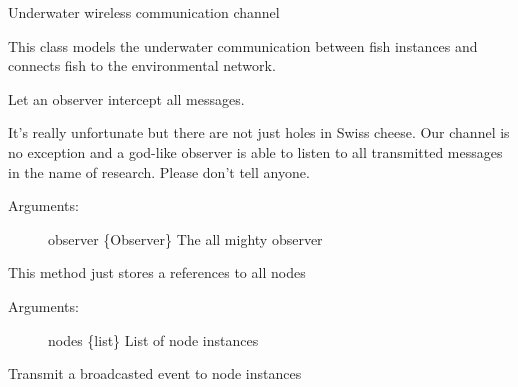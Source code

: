 \documentclass[letterpaper,10pt,english]{sphinxmanual}
\begin{document}
\begin{fulllineitems}
\label{\detokenize{index:channel.Channel}}
Underwater wireless communication channel

This class models the underwater communication between fish instances and
connects fish to the environmental network.

\begin{fulllineitems}
\label{\detokenize{index:channel.Channel.intercept}}
Let an observer intercept all messages.

It’s really unfortunate but there are not just holes in Swiss cheese.
Our channel is no exception and a god-like observer is able to listen
to all transmitted messages in the name of research. Please don’t tell
anyone.
\begin{description}
\item[{Arguments:}] \leavevmode
observer \{Observer\} \textendash{} The all mighty observer

\end{description}

\end{fulllineitems}


\begin{fulllineitems}
\label{\detokenize{index:channel.Channel.set_nodes}}
This method just stores a references to all nodes
\begin{description}
\item[{Arguments:}] \leavevmode
nodes \{list\} \textendash{} List of node instances

\end{description}

\end{fulllineitems}


\begin{fulllineitems}
\label{\detokenize{index:channel.Channel.transmit}}
Transmit a broadcasted event to node instances


\end{fulllineitems}
\end{fulllineitems}
\end{document}
